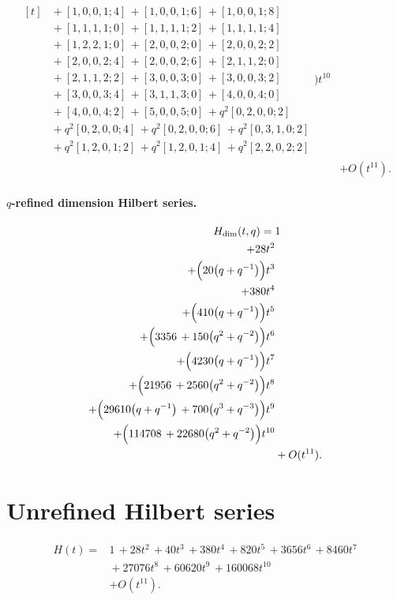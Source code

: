 \documentclass[10pt]{article}
\begin{document}
\[\begin{aligned}
\begin{aligned}[t]
  &{}+[1,0,0,1;4]\,+[1,0,0,1;6]\,+[1,0,0,1;8] \\
  &{}+[1,1,1,1;0]\,+[1,1,1,1;2]\,+[1,1,1,1;4] \\
  &{}+[1,2,2,1;0]\,+[2,0,0,2;0]\,+[2,0,0,2;2] \\
  &{}+[2,0,0,2;4]\,+[2,0,0,2;6]\,+[2,1,1,2;0] \\
  &{}+[2,1,1,2;2]\,+[3,0,0,3;0]\,+[3,0,0,3;2] \\
  &{}+[3,0,0,3;4]\,+[3,1,1,3;0]\,+[4,0,0,4;0] \\
  &{}+[4,0,0,4;2]\,+[5,0,0,5;0]\,+q^{2}[0,2,0,0;2] \\
  &{}+q^{2}[0,2,0,0;4]\,+q^{2}[0,2,0,0;6]\,+q^{2}[0,3,1,0;2] \\
  &{}+q^{2}[1,2,0,1;2]\,+q^{2}[1,2,0,1;4]\,+q^{2}[2,2,0,2;2]\end{aligned}\Bigr)t^{10} \\
  &+ O(t^{11}).
\end{aligned}
\]
\paragraph{$q$-refined dimension Hilbert series.}
\[
\begin{aligned}
H_{\mathrm{dim}}(t,q) ={}&
   1 \\
  + 28t^{2} \\
  + \Bigl(20\bigl(q+q^{-1}\bigr)\Bigr)t^{3} \\
  + 380t^{4} \\
  + \Bigl(410\bigl(q+q^{-1}\bigr)\Bigr)t^{5} \\
  + \Bigl(3356\,+150\bigl(q^{2}+q^{-2}\bigr)\Bigr)t^{6} \\
  + \Bigl(4230\bigl(q+q^{-1}\bigr)\Bigr)t^{7} \\
  + \Bigl(21956\,+2560\bigl(q^{2}+q^{-2}\bigr)\Bigr)t^{8} \\
  + \Bigl(29610\bigl(q+q^{-1}\bigr)\,+700\bigl(q^{3}+q^{-3}\bigr)\Bigr)t^{9} \\
  + \Bigl(114708\,+22680\bigl(q^{2}+q^{-2}\bigr)\Bigr)t^{10} \\
  &+ O(t^{11}).
\end{aligned}
\]

\section{Unrefined Hilbert series}
\[
\begin{aligned}
H(t) ={}& 1\,+28t^{2}\,+40t^{3}\,+380t^{4}\,+820t^{5}\,+3656t^{6}\,+8460t^{7} \\
  &{}+27076t^{8}\,+60620t^{9}\,+160068t^{10} \\
  &+ O(t^{11}).
\end{aligned}
\]
\end{document}
